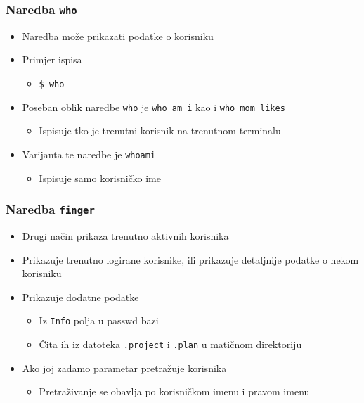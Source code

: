 \documentclass[table,usenames,dvipsnames] {beamer}
\newcommand{\shell}[1]{\texttt{#1}}
\begin{document}
\begin{frame}[t]
\frametitle{Naredba \shell{who}}
\begin{itemize}
  \item Naredba može prikazati podatke o korisniku
  \item Primjer ispisa
  \begin{itemize}
    \item[] \shell{\$ who}
    \begin{table}[h]
    \end{table}
  \end{itemize}
  \item Poseban oblik naredbe \shell{who} je \shell{who am i} kao i \shell{who mom likes}
  \begin{itemize}
    \item Ispisuje tko je trenutni korisnik na trenutnom terminalu
  \end{itemize}
  \item Varijanta te naredbe je \shell{whoami}
  \begin{itemize}
    \item Ispisuje samo korisničko ime
  \end{itemize}
\end{itemize}
\end{frame}

\begin{frame}[t]
\frametitle{Naredba \shell{finger}}
\begin{itemize}
  \item Drugi način prikaza trenutno aktivnih korisnika
  \item Prikazuje trenutno logirane korisnike, ili prikazuje 
          detaljnije podatke o nekom korisniku
\end{itemize}
\begin{itemize}
   \item Prikazuje dodatne podatke
   \begin{itemize}
   	\item Iz \shell{Info} polja u passwd bazi
   	\item Čita ih iz datoteka \shell{.project} i \shell{.plan} u matičnom direktoriju
   \end{itemize}
   \item Ako joj zadamo parametar pretražuje korisnika
   \begin{itemize}
   	\item Pretraživanje se obavlja po korisničkom imenu i pravom imenu
   \end{itemize}
\end{itemize}
\end{frame}
\end{document}
